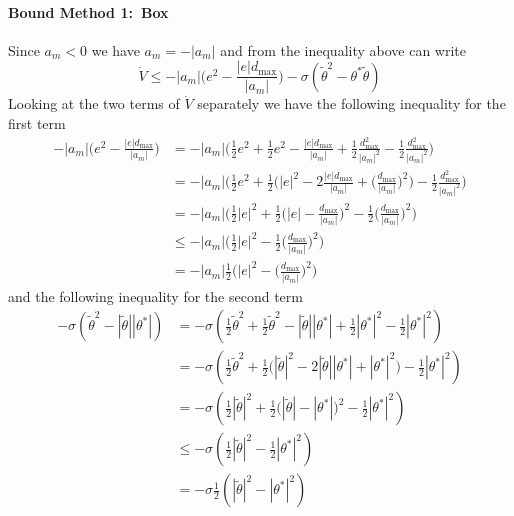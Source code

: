 \paragraph{Bound Method 1:\ Box}
Since $a_{m}<0$ we have $a_{m}=-|a_{m}|$ and from the inequality above can write
\begin{equation*}
  \dot{V}
  \leq
  -|a_{m}|\biggr(e^{2}-\frac{|e|d_{\text{max}}}{|a_{m}|}\biggr)-\sigma(\tilde{\theta}^{2}-\theta^{*}\tilde{\theta})
\end{equation*}
Looking at the two terms of $\dot{V}$ separately we have the following inequality for the first term
\begin{align*}
  -|a_{m}|\biggr(e^{2}-\frac{|e|d_{\text{max}}}{|a_{m}|}\biggr)
  &=
  -|a_{m}|\biggr(\frac{1}{2}e^{2}+\frac{1}{2}e^{2}-\frac{|e|d_{\text{max}}}{|a_{m}|}+\frac{1}{2}\frac{d_{\text{max}}^{2}}{|a_{m}|^{2}}-\frac{1}{2}\frac{d_{\text{max}}^{2}}{|a_{m}|^{2}}\biggr) \\
  &=
  -|a_{m}|\biggr(\frac{1}{2}e^{2}+\frac{1}{2}\biggr(|e|^{2}-2\frac{|e|d_{\text{max}}}{|a_{m}|}+\biggr(\frac{d_{\text{max}}}{|a_{m}|}\biggr)^{2}\biggr)-\frac{1}{2}\frac{d_{\text{max}}^{2}}{|a_{m}|^{2}}\biggr) \\
  &=
  -|a_{m}|\biggr(\frac{1}{2}|e|^{2}+\frac{1}{2}\biggr(|e|-\frac{d_{\text{max}}}{|a_{m}|}\biggr)^{2}-\frac{1}{2}\biggr(\frac{d_{\text{max}}}{|a_{m}|}\biggr)^{2}\biggr) \\
  &\leq
  -|a_{m}|\biggr(\frac{1}{2}|e|^{2}-\frac{1}{2}\biggr(\frac{d_{\text{max}}}{|a_{m}|}\biggr)^{2}\biggr) \\
  &=
  -|a_{m}|\frac{1}{2}\biggr(|e|^{2}-\biggr(\frac{d_{\text{max}}}{|a_{m}|}\biggr)^{2}\biggr)
\end{align*}
and the following inequality for the second term
\begin{align*}
  -\sigma\left(\tilde{\theta}^{2}-|\tilde{\theta}||\theta^{*}|\right)
  &=
  -\sigma\left(\frac{1}{2}\tilde{\theta}^{2}+\frac{1}{2}\tilde{\theta}^{2}-|\tilde{\theta}||\theta^{*}|+\frac{1}{2}|\theta^{*}|^{2}-\frac{1}{2}|\theta^{*}|^{2}\right) \\
  &=
  -\sigma\left(\frac{1}{2}\tilde{\theta}^{2}+\frac{1}{2}\bigr(|\tilde{\theta}|^{2}-2|\tilde{\theta}||\theta^{*}|+|\theta^{*}|^{2}\bigr)-\frac{1}{2}|\theta^{*}|^{2}\right) \\
  &=
  -\sigma\left(\frac{1}{2}|\tilde{\theta}|^{2}+\frac{1}{2}\bigr(|\tilde{\theta}|-|\theta^{*}|\bigr)^{2}-\frac{1}{2}|\theta^{*}|^{2}\right) \\
  &\leq
  -\sigma\left(\frac{1}{2}|\tilde{\theta}|^{2}-\frac{1}{2}|\theta^{*}|^{2}\right) \\
  &=
  -\sigma\frac{1}{2}\left(|\tilde{\theta}|^{2}-|\theta^{*}|^{2}\right)
\end{align*}
